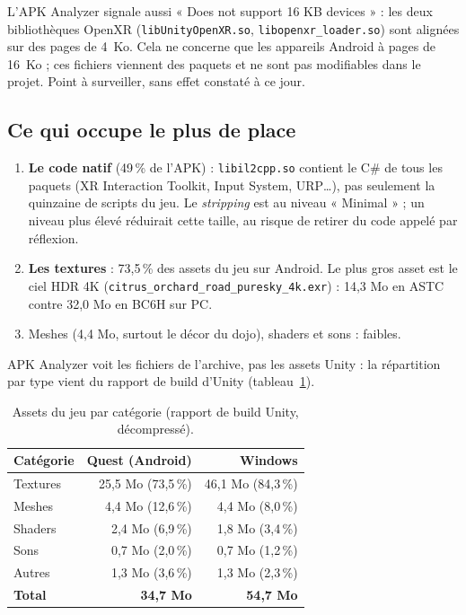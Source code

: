 \documentclass[11pt,a4paper]{article}
\newcommand{\fichier}[1]{\texttt{\small #1}}
\begin{document}
L'APK Analyzer signale aussi « Does not support 16 KB devices » : les deux bibliothèques OpenXR
(\texttt{libUnityOpenXR.so}, \texttt{libopenxr\_loader.so}) sont alignées sur des pages de 4~Ko. Cela ne
concerne que les appareils Android à pages de 16~Ko ; ces fichiers viennent des paquets et ne sont pas
modifiables dans le projet. Point à surveiller, sans effet constaté à ce jour.

\subsection{Ce qui occupe le plus de place}

\begin{enumerate}
\item \textbf{Le code natif} (49\,\% de l'APK) : \fichier{libil2cpp.so} contient le C\# de tous les paquets
  (XR Interaction Toolkit, Input System, URP\ldots), pas seulement la quinzaine de scripts du jeu. Le
  \emph{stripping} est au niveau « Minimal » ; un niveau plus élevé réduirait cette taille, au risque de
  retirer du code appelé par réflexion.
\item \textbf{Les textures} : 73,5\,\% des assets du jeu sur Android. Le plus gros asset est le ciel HDR
  4K (\fichier{citrus\_orchard\_road\_puresky\_4k.exr}) : 14,3 Mo en ASTC contre 32,0 Mo en BC6H sur PC.
\item Meshes (4,4 Mo, surtout le décor du dojo), shaders et sons : faibles.
\end{enumerate}

APK Analyzer voit les fichiers de l'archive, pas les assets Unity : la répartition par type vient du
rapport de build d'Unity (tableau~\ref{tab:types}).

\begin{table}[H]
\centering\small
\caption{Assets du jeu par catégorie (rapport de build Unity, décompressé).}
\label{tab:types}
\begin{tabular}{@{}lrr@{}}
\toprule
Catégorie & Quest (Android) & Windows \\
\midrule
Textures & 25,5 Mo (73,5\,\%) & 46,1 Mo (84,3\,\%) \\
Meshes & 4,4 Mo (12,6\,\%) & 4,4 Mo (8,0\,\%) \\
Shaders & 2,4 Mo (6,9\,\%) & 1,8 Mo (3,4\,\%) \\
Sons & 0,7 Mo (2,0\,\%) & 0,7 Mo (1,2\,\%) \\
Autres & 1,3 Mo (3,6\,\%) & 1,3 Mo (2,3\,\%) \\
\midrule
\textbf{Total} & \textbf{34,7 Mo} & \textbf{54,7 Mo} \\
\bottomrule
\end{tabular}
\end{table}
\end{document}
